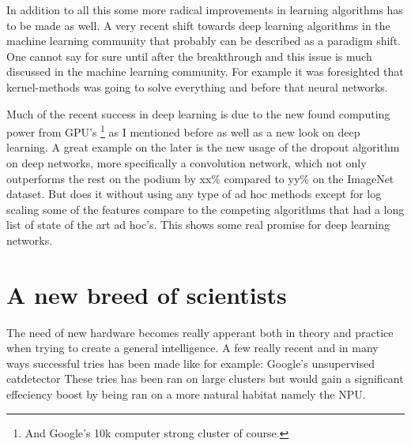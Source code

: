 \documentclass{article}
\begin{document}
    In addition to all this some more radical improvements in learning
    algorithms has to be made as well. A very recent shift towards deep
    learning algorithms in the machine learning community that probably can be
    described as a paradigm shift. One cannot say for sure until after the
    breakthrough and this issue is much discussed in the machine learning
    community. For example it was foresighted that kernel-methods was going to
    solve everything and before that neural networks.
   
    Much of the recent success in deep learning is due to the new found computing
    power from GPU's \footnote{And Google's 10k computer strong cluster of
    course.} as I mentioned before as well as a new look 
    on deep learning. A great
    example on the later is the new usage of the dropout algorithm on deep networks, 
    more specifically a convolution network, which not only
    outperforms the rest on the podium by xx\% compared to yy\% on the 
    ImageNet dataset.\cite{imagenet}
    But does it without using any type of ad hoc methods except for log scaling some of the
    features compare to the competing algorithms that had a long list of state
    of the art ad hoc's.\cite{dropout} This shows some real promise for deep
    learning networks.

\section{A new breed of scientists}
    The need of new hardware becomes really apperant both in
    theory and practice when trying to create a general intelligence.
    A few really recent and in many ways successful tries has been made
    like for example: Google's unsupervised catdetector %
    These tries has been ran on large clusters but would gain a
    significant effeciency boost by being ran on a more natural habitat namely the
    NPU. 


    
    
\end{document}
